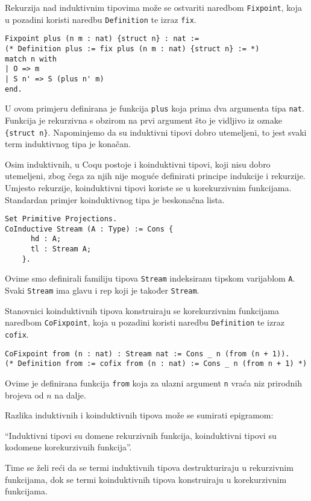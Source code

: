 Rekurzija nad induktivnim tipovima može se ostvariti naredbom \texttt{Fixpoint}, koja u pozadini koristi naredbu \texttt{Definition} te izraz \texttt{fix}.
\begin{verbatim}
Fixpoint plus (n m : nat) {struct n} : nat :=
(* Definition plus := fix plus (n m : nat) {struct n} := *)
match n with
| O => m
| S n' => S (plus n' m)
end.
\end{verbatim}
U ovom primjeru definirana je funkcija \texttt{plus} koja prima dva argumenta tipa \texttt{nat}.
Funkcija je rekurzivna s obzirom na prvi argument što je vidljivo iz oznake  \texttt{\{struct n\}}.
Napominjemo da su induktivni tipovi dobro utemeljeni, to jest svaki term induktivnog tipa je konačan.

Osim induktivnih, u Coqu postoje i koinduktivni tipovi, koji nisu dobro utemeljeni,
zbog čega za njih nije moguće definirati principe indukcije i rekurzije.
Umjesto rekurzije, koinduktivni tipovi koriste se u korekurzivnim funkcijama.
Standardan primjer koinduktivnog tipa je beskonačna lista.
\begin{verbatim}
Set Primitive Projections.
CoInductive Stream (A : Type) := Cons {
      hd : A;
      tl : Stream A;
    }.
\end{verbatim}
Ovime smo definirali familiju tipova \texttt{Stream} indeksiranu tipskom varijablom \texttt{A}.
Svaki \texttt{Stream} ima glavu i rep koji je također \texttt{Stream}.

Stanovnici koinduktivnih tipova konstruiraju se korekurzivnim funkcijama naredbom \texttt{CoFixpoint}, koja u pozadini koristi naredbu \texttt{Definition} te izraz \texttt{cofix}.
\begin{verbatim}
CoFixpoint from (n : nat) : Stream nat := Cons _ n (from (n + 1)).
(* Definition from := cofix from (n : nat) := Cons _ n (from n + 1) *)
\end{verbatim}
Ovime je definirana funkcija \texttt{from} koja za ulazni argument \texttt{n} vraća niz prirodnih brojeva od \(n\) na dalje.

Razlika induktivnih i koinduktivnih tipova može se sumirati epigramom:
\begin{displayquote}
  \enquote{Induktivni tipovi su domene rekurzivnih funkcija, koinduktivni tipovi su kodomene korekurzivnih funkcija}.
\end{displayquote}
\noindent Time se želi reći da se termi induktivnih tipova destrukturiraju u rekurzivnim funkcijama,
dok se termi koinduktivnih tipova konstruiraju u korekurzivnim funkcijama.

